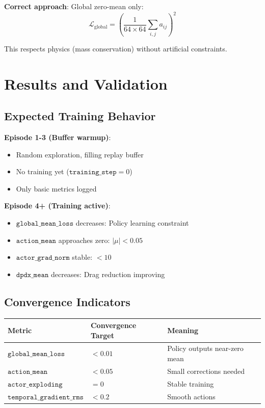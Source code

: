 \documentclass[11pt,a4paper]{article}
\theoremstyle{definition}
\begin{document}
\textbf{Correct approach}: Global zero-mean only:
\begin{equation}
    \mathcal{L}_{\text{global}} = \left(\frac{1}{64 \times 64}\sum_{i,j} a_{ij}\right)^2
\end{equation}

This respects physics (mass conservation) without artificial constraints.

\section{Results and Validation}

\subsection{Expected Training Behavior}

\textbf{Episode 1-3 (Buffer warmup)}:
\begin{itemize}
    \item Random exploration, filling replay buffer
    \item No training yet ($\texttt{training\_step} = 0$)
    \item Only basic metrics logged
\end{itemize}

\textbf{Episode 4+ (Training active)}:
\begin{itemize}
    \item $\texttt{global\_mean\_loss}$ decreases: Policy learning constraint
    \item $\texttt{action\_mean}$ approaches zero: $|\mu| < 0.05$
    \item $\texttt{actor\_grad\_norm}$ stable: $< 10$
    \item $\texttt{dpdx\_mean}$ decreases: Drag reduction improving
\end{itemize}

\subsection{Convergence Indicators}

\begin{center}
\begin{tabular}{lll}
\toprule
\textbf{Metric} & \textbf{Convergence Target} & \textbf{Meaning} \\
\midrule
$\texttt{global\_mean\_loss}$ & $< 0.01$ & Policy outputs near-zero mean \\
$\texttt{action\_mean}$ & $< 0.05$ & Small corrections needed \\
$\texttt{actor\_exploding}$ & $= 0$ & Stable training \\
$\texttt{temporal\_gradient\_rms}$ & $< 0.2$ & Smooth actions \\
\bottomrule
\end{tabular}
\end{center}
\end{document}

